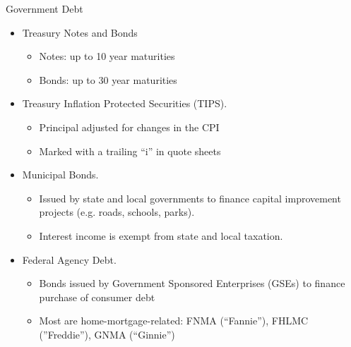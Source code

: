 \documentclass{beamer}
\begin{document}
\begin{frame}{Government Debt}
\begin{itemize}
\item Treasury Notes and Bonds
\begin{itemize}
\item Notes: up to 10 year maturities
\item Bonds: up to 30 year maturities
\end{itemize}
\item Treasury Inflation Protected Securities (TIPS).
\begin{itemize}
\item Principal adjusted for changes in the CPI
\item Marked with a trailing ``i'' in quote sheets
\end{itemize}
\item Municipal Bonds.
\begin{itemize}
\item Issued by state and local governments to finance capital improvement projects (e.g. roads, schools, parks). 
\item Interest income is exempt from state and local taxation.
\end{itemize}
\item Federal Agency Debt.
\begin{itemize}
\item Bonds issued by Government Sponsored Enterprises (GSEs) to finance purchase of consumer debt
\item Most are home-mortgage-related: FNMA (``Fannie''), FHLMC (''Freddie''), GNMA (``Ginnie'')
\end{itemize}
\end{itemize}
\end{frame}
\end{document}
